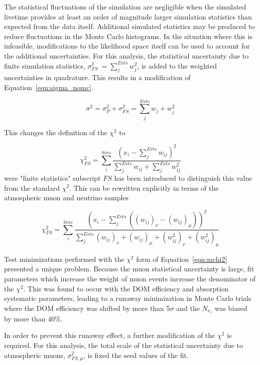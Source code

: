 The statistical fluctuations of the simulation are negligible when the simulated livetime provides at least an order of magnitude larger simulation statistics than expected from the data itself.
Additional simulated statistics may be produced to reduce fluctuations in the Monte Carlo histograms.
In the situation where this is infeasible, modifications to the likelihood space itself can be used to account for the additional uncertainties.
For this analysis, the statistical uncertainty due to finite simulation statistics, $\sigma^2_{FS}~=\sum_j^{Evts} w_j^2$, is added to the weighted uncertainties in quadrature.
This results in a modification of Equation~\ref{eqn:sigma_nomc}.

\begin{equation}
\label{eqn:sigma_mc}
	\sigma^2 = \sigma^2_P + \sigma^2_{FS} =  \sum_j^{Evts} w_j + w_j^2
\end{equation}

This changes the definition of the $\chi^2$ to

\begin{equation}
\label{eqn:mchi2}
	\chi_{FS}^2 = \sum_i^{bins} \frac{\left(x_i-\sum_j^{Evts} w_{ij}\right)^2}{\sum_j^{Evts}w_{ij} + \sum_j^{Evts}{w_{ij}^2}}
\end{equation}		
%
were "finite statistics" subscript $FS$ has been introduced to distinguish this value from the standard $\chi^2$.
This can be rewritten explicitly in terms of the atmospheric muon and neutrino samples

\begin{equation}
	\chi_{FS}^2 = \sum_i^{bins} \frac{\left(x_i- \sum_j^{Evts} \left( \left(w_{ij}\right)_\nu - \left(w_{ij}\right)_\mu\right) \right)^2}
		{\sum_j^{Evts}\left(w_{ij}\right)_\nu + \left(w_{ij}\right)_\mu + \left(w^2_{ij}\right)_\nu +\left(w^2_{ij}\right)_\mu}
\end{equation}	

Test minimizations performed with the $\chi^2$ form of Equation~\ref{eqn:mchi2} presented a unique problem.
Because the muon statistical uncertainty is large, fit parameters which increase the weight of muon events increase the denominator of the $\chi^2$.
This was found to occur with the DOM efficiency and absorption systematic parameters, leading to a runaway minimization in Monte Carlo trials where the DOM efficiency was shifted by more than 5$\sigma$ and the $N_{\nu_\tau}$ was biased by more than 40\%.

In order to prevent this runaway effect, a further modification of the $\chi^2$ is required.
For this analysis, the total scale of the statistical uncertainty due to atmospheric muons, $\sigma^2_{FS, \mu}$, is fixed the seed values of the fit.

